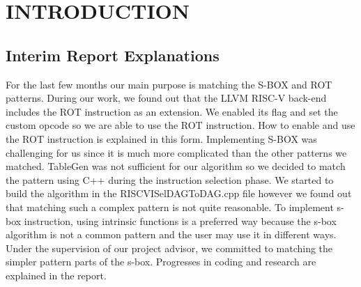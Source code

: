 \chapter{INTRODUCTION}\label{Ch1}


\section{Interim Report Explanations}\label{plan}

For the last few months our main purpose is matching the S-BOX and ROT patterns. During our work, we found out that the LLVM RISC-V back-end includes the ROT instruction as an extension. We enabled its flag and set the custom opcode so we are able to use the ROT instruction. How to enable and use the ROT instruction is explained in this form. Implementing S-BOX was challenging for us since it is much more complicated than the other patterns we matched. TableGen was not sufficient for our algorithm so we decided to match the pattern using C++ during the instruction selection phase. We started to build the algorithm in the RISCVISelDAGToDAG.cpp file however we found out that matching such a complex pattern is not quite reasonable. To implement s-box instruction, using intrinsic functions is a preferred way because the s-box algorithm is not a common pattern and the user may use it in different ways. Under the supervision of our project advisor, we committed to matching the simpler pattern parts of the s-box. Progresses in coding and research are explained in the report.
